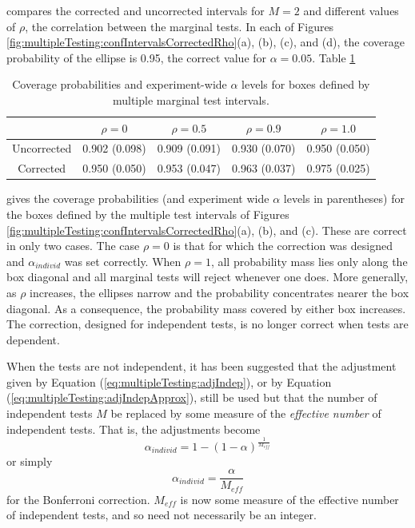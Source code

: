 \documentclass[letterpaper,12pt,oneside,final]{article}
\begin{document}
compares the corrected and uncorrected intervals for $M = 2$ and different values of $\rho$, the correlation between the marginal tests. In each of Figures \ref{fig:multipleTesting:confIntervalsCorrectedRho}(a), (b), (c), and (d), the coverage probability of the ellipse is 0.95,  the correct value for $\alpha = 0.05$. Table \ref{tab:multipleTesting:coverage}
\begin{table}[htp]
\begin{center}
\begin{tabular}{c|cccc}
& 
$\rho = 0$ &
$\rho = 0.5$ &
$\rho = 0.9$&
$\rho = 1.0$ \\
\hline
Uncorrected & 
0.902 (0.098) &
0.909 (0.091) &
0.930 (0.070) &
0.950 (0.050)
\\
Corrected &
0.950 (0.050) &
0.953 (0.047) &
0.963 (0.037) &
0.975 (0.025)

\end{tabular}
\end{center}
\caption{Coverage probabilities and experiment-wide $\alpha$ levels for boxes defined by multiple marginal test intervals.}
\label{tab:multipleTesting:coverage}
\end{table}
gives the coverage probabilities (and experiment wide $\alpha$ levels in parentheses) for the boxes defined by the multiple test intervals of Figures \ref{fig:multipleTesting:confIntervalsCorrectedRho}(a), (b), and (c).  
These are correct in only two cases. The case $\rho = 0$ is that for which the correction was designed and $\alpha_{individ}$ was set correctly. When $\rho = 1$,  all probability mass lies only along the box diagonal and all marginal tests will reject whenever one does. More generally, as $\rho$ increases, the ellipses narrow and the probability concentrates nearer the box diagonal. As a consequence, the probability mass covered by either box increases. The correction, designed for independent tests, is no longer correct when tests are dependent.

When the tests are not independent, it has been suggested that the adjustment given by Equation (\ref{eq:multipleTesting:adjIndep}), or by Equation (\ref{eq:multipleTesting:adjIndepApprox}), still be used but that the number of independent tests $M$ be replaced by some measure of the \emph{effective number} of independent tests. That is, the adjustments become
\begin{equation}
\alpha_{individ} = 1 - (1 - \alpha)^\frac{1}{M_{eff}}
\label{eq:multipleTesting:adjIndepEff}
\end{equation}
or simply
\begin{equation}
\alpha_{individ} = \frac{\alpha}{M_{eff}}
\label{eq:multipleTesting:adjIndepEffApprox}
\end{equation}
for the Bonferroni correction. $M_{eff}$ is now some measure of the effective number of independent tests, and so need not necessarily be an integer.
\end{document}
